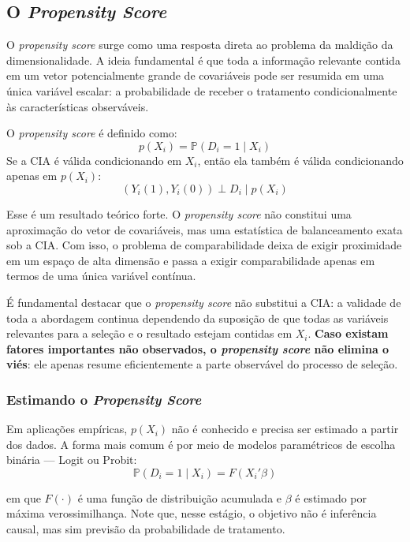 \documentclass[12pt,a4paper]{article}
\begin{document}
\subsection{O \textit{Propensity Score}}

O \textit{propensity score} surge como uma resposta direta ao problema da maldição da dimensionalidade. A ideia fundamental é que toda a informação relevante contida em um vetor potencialmente grande de covariáveis pode ser resumida em uma única variável escalar: a probabilidade de receber o tratamento condicionalmente às características observáveis.

\begin{hipotesebox}
O \textit{propensity score} é definido como:
$$p(X_i) = \mathbb{P}(D_i = 1 \mid X_i)$$
Se a CIA é válida condicionando em $X_i$, então ela também é válida condicionando apenas em $p(X_i)$:
$$(Y_i(1), Y_i(0)) \perp D_i \mid p(X_i)$$
\end{hipotesebox}

Esse é um resultado teórico forte. O \textit{propensity score} não constitui uma aproximação do vetor de covariáveis, mas uma estatística de balanceamento exata sob a CIA. Com isso, o problema de comparabilidade deixa de exigir proximidade em um espaço de alta dimensão e passa a exigir comparabilidade apenas em termos de uma única variável contínua.

É fundamental destacar que o \textit{propensity score} não substitui a CIA: a validade de toda a abordagem continua dependendo da suposição de que todas as variáveis relevantes para a seleção e o resultado estejam contidas em $X_i$. \textbf{Caso existam fatores importantes não observados, o \textit{propensity score} não elimina o viés}: ele apenas resume eficientemente a parte observável do processo de seleção.

\subsubsection{Estimando o \textit{Propensity Score}}

Em aplicações empíricas, $p(X_i)$ não é conhecido e precisa ser estimado a partir dos dados. A forma mais comum é por meio de modelos paramétricos de escolha binária --- Logit ou Probit:
$$\mathbb{P}(D_i = 1 \mid X_i) = F(X_i'\beta)$$

em que $F(\cdot)$ é uma função de distribuição acumulada e $\beta$ é estimado por máxima verossimilhança. Note que, nesse estágio, o objetivo não é inferência causal, mas sim previsão da probabilidade de tratamento.
\end{document}
